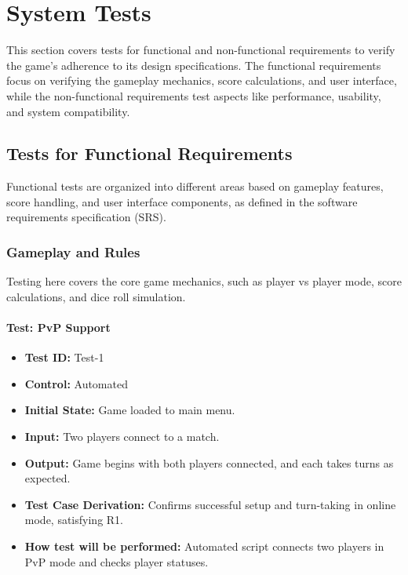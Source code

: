 \documentclass[12pt, titlepage]{article}
\begin{document}
\section{System Tests}

This section covers tests for functional and non-functional requirements to verify the game's adherence to its design specifications. The functional requirements focus on verifying the gameplay mechanics, score calculations, and user interface, while the non-functional requirements test aspects like performance, usability, and system compatibility.

\subsection{Tests for Functional Requirements}

Functional tests are organized into different areas based on gameplay features, score handling, and user interface components, as defined in the software requirements specification (SRS).

\subsubsection{Gameplay and Rules}

Testing here covers the core game mechanics, such as player vs player mode, score calculations, and dice roll simulation.

\paragraph{Test: PvP Support}
\begin{itemize}
    \item \textbf{Test ID:} Test-1
    \item \textbf{Control:} Automated
    \item \textbf{Initial State:} Game loaded to main menu.
    \item \textbf{Input:} Two players connect to a match.
    \item \textbf{Output:} Game begins with both players connected, and each takes turns as expected.
    \item \textbf{Test Case Derivation:} Confirms successful setup and turn-taking in online mode, satisfying R1.
    \item \textbf{How test will be performed:} Automated script connects two players in PvP mode and checks player statuses.
\end{itemize}
\end{document}
